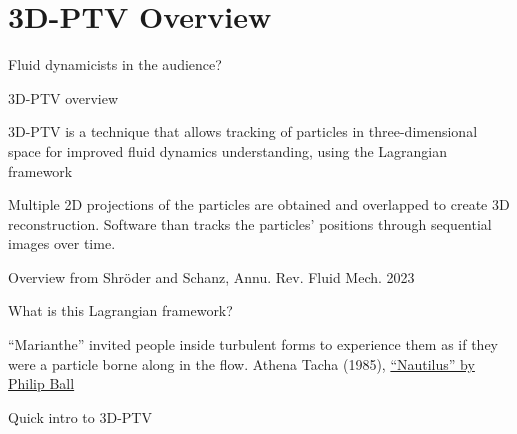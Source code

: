 

% 

\section{3D-PTV Overview}

\begin{frame}[label=ptv-1]{Fluid dynamicists in the audience?}
\centering{}
\end{frame}


\begin{frame}[label=ptv-21]{3D-PTV overview}
\begin{multicols}{2}
\begin{card}
3D-PTV is a technique that allows tracking of particles in three-dimensional space for improved fluid dynamics understanding, using the Lagrangian framework
\end{card}
\begin{card}
Multiple 2D projections of the particles are obtained and overlapped to create 3D reconstruction. Software than tracks the particles' positions through sequential images over time. 
\end{card}
\end{multicols}
\end{frame}


%
\begin{frame}[label=ptv-211]{Overview from Shr\"{o}der and Schanz, Annu. Rev. Fluid Mech. 2023}
\end{frame}

\begin{frame}[label=ptv-3]{What is this Lagrangian framework?}
\centering{}
\vspace{-.3cm}
\begin{cardTiny}
``Marianthe'' invited people inside turbulent forms to experience them as
if they were a particle borne along in the flow. Athena
Tacha (1985), \href{http://nautil.us/issue/15/turbulence/the-scientific-problem-that-must-be-experienced}{``Nautilus'' by Philip Ball}
\end{cardTiny}
\end{frame}
%

\begin{frame}[label=ptv-4]{Quick intro to 3D-PTV}
\end{frame}


